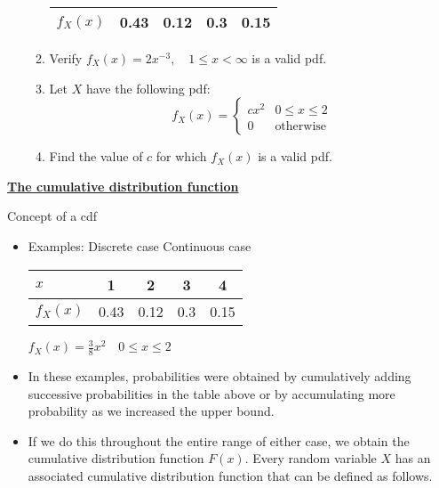 \documentclass{article}
\newcommand{\bu}[1]{\textbf{\ul{#1}}}				%
\begin{document}
\begin{itemize}
\begin{enumerate}
\begin{tabular}{| l | c | c | c | c |}
             \hline
             $f_X(x)$ & 0.43 & 0.12 & 0.3 & 0.15\\
             \hline
         \end{tabular}\vspace{40pt}
        \item Verify $f_X(x) = 2 x^{-3}, \quad 1 \le x < \infty$ is a valid pdf.\vspace{60pt}
        \item Let $X$ have the following pdf:
        \[
        f_X(x) =
            \left\{
            \begin{array}{ll}
                 cx^2 & 0 \le x \le 2\\
                 0 & \text{otherwise}
            \end{array}
            \right.
        \]
        \item[] Find the value of $c$ for which $f_X(x)$ is a valid pdf.\vspace{120pt}
    \end{enumerate}
\end{itemize}\bigskip

\bu{The cumulative distribution function}\bigskip

Concept of a cdf
\begin{itemize}
    \item Examples: Discrete case \hfill Continuous case\bigskip\\
    \begin{tabular}{| l | c | c | c | c |}
         \hline
         $x$ & 1 & 2 & 3 & 4\\
         \hline
         $f_X(x)$ & 0.43 & 0.12 & 0.3 & 0.15\\
         \hline
     \end{tabular}
     \hfill $f_X(x) = \frac{3}{8} x^2 \quad 0 \le x \le 2$\vspace{50pt}
     \item In these examples, probabilities were obtained by cumulatively adding successive probabilities in the table above or by accumulating more probability as we increased the upper bound.
    \item[] If we do this throughout the entire range of either case, we obtain the cumulative distribution function $F(x)$. Every random variable $X$ has an associated cumulative distribution function that can be defined as follows.
\end{itemize}\bigskip
\end{document}
